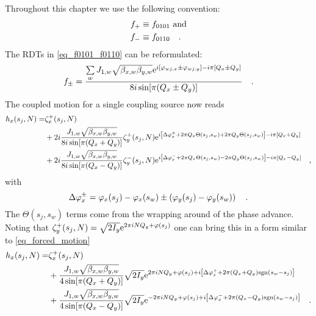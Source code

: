 Throughout this chapter we use the following convention:
%
\begin{align}
    f_+ &\equiv f_{0101} \text{ and}\notag \\
    f_- &\equiv f_{0110} 
    \quad .
\end{align}
%
The RDTs in \eqref{eq_f0101_f0110} can be reformulated:
%
\begin{equation}
    f_\pm = 
    \frac{
        \sum\limits_w J_{1,w} \sqrt{\beta_{x,w}\beta_{y,w}}
        \text{e}^{
            i\left[\varphi_{wj,x} \pm \varphi_{wj,y}\right]
            -i\pi\left[Q_x\pm Q_y\right]
        }
    }{
        8i\sin[\pi(Q_x\pm Q_y)]
    }
    \quad .
\end{equation}
%
The coupled motion for a single coupling source now reads
%
\begin{align}
    h_x(s_j,N) =& \zeta_x^+(s_j,N) \notag \\
    &+2i\frac{
         J_{1,w} \sqrt{\beta_{x,w}\beta_{y,w}}
    }{
        8i\sin[\pi(Q_x + Q_y)]
    }
    \zeta_y^+(s_j,N)
        \text{e}^{
            i\left[\Delta\varphi_x^+ + 2\pi Q_x \Theta(s_j,s_w) + 2\pi Q_y \Theta(s_j,s_w)\right]
            -i\pi\left[Q_x + Q_y\right]
        }
        \notag \\
    &+2i\frac{
         J_{1,w} \sqrt{\beta_{x,w}\beta_{y,w}}
    }{
        8i\sin[\pi(Q_x - Q_y)]
    }
    \zeta_y^-(s_j,N)
        \text{e}^{
            i\left[\Delta\varphi_x^- + 2\pi Q_x \Theta(s_j,s_w) - 2\pi Q_y \Theta(s_j,s_w)\right]
            -i\pi\left[Q_x - Q_y\right]
        }
        \quad ,
\end{align}
%
with 
%
\begin{equation}
    \Delta\varphi_x^\pm = \varphi_x(s_j) - \varphi_x(s_w) \pm \left(\varphi_y(s_j) - \varphi_y(s_w)\right)
    \quad .
\end{equation}
%
The $\Theta(s_j,s_w)$ terms come from the wrapping around of the phase advance. Noting that 
$\zeta_y^+(s_j,N) = \sqrt{2I_y}\text{e}^{2\pi i N Q_y + \varphi(s_j)}$
one can bring this in a form similar to \eqref{eq_forced_motion}
%
\begin{align}
    h_x(s_j,N) =& \zeta_x^+(s_j,N) \notag \\
    &+\frac{
         J_{1,w} \sqrt{\beta_{x,w}\beta_{y,w}}
    }{
        4\sin[\pi(Q_x + Q_y)]
    }
    \sqrt{2I_y}
    \text{e}^{
        2\pi i N Q_y + \varphi(s_j)
        +i\left[\Delta\varphi_x^+ + 2\pi (Q_x+Q_y) \text{sgn}(s_w-s_j)\right]
    }
        \notag \\
    &+\frac{
        J_{1,w} \sqrt{\beta_{x,w}\beta_{y,w}}
    }{
        4\sin[\pi(Q_x - Q_y)]
    }
    \sqrt{2I_y}
    \text{e}^{
        -2\pi i N Q_y + \varphi(s_j)
        +i\left[\Delta\varphi_x^- + 2\pi (Q_x-Q_y) \text{sgn}(s_w-s_j)\right]
    }
    \quad .
\end{align}
